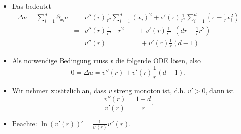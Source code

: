 \documentclass{book}
\newenvironment{itemizedot}{\begin{itemize} \renewcommand{\labelitemi}{$\bullet$}\renewcommand{\labelitemii}{$\bullet$}\renewcommand{\labelitemiii}{$\bullet$}\renewcommand{\labelitemiv}{$\bullet$}}{\end{itemize}}
\begin{document}
\begin{remark*}
\begin{itemizedot}
    
    \[ \nabla_x r = \left( (\langle x, x \rangle)^{\frac{1}{2}} \right)' =
       \frac{1}{2} (\langle x, x \rangle)^{- \frac{1}{2}}  (\langle x, x
       \rangle)' = \frac{1}{2} (\langle x, x \rangle)^{- \frac{1}{2}} 2 x =
       \frac{x}{r} \]
    wobei man $(\langle x, x \rangle)' = 2 x$ aus
    \[ \langle x + h, x + h \rangle = \langle x, x \rangle + 2 \langle x, h
       \rangle + \langle h, h \rangle \]
    f{\"u}r $h \rightarrow 0$ sieht, also insbesondere
    \[ \partial_{x_i} r (x) = \frac{x_i}{r (x)}, \]
    und damit
    \[ \partial_{x_i} u = v' (r) \partial_{x_i} r = v' (r) \frac{x_i}{r} \]
    sowie
    \[ \partial^2_{x_i} u = v'' (r) \left( \frac{x_i}{r} \right)^2 + v' (r)
       \left( \frac{x_i}{r} \right)' = v'' (r) \left( \frac{x_i}{r} \right)^2
       + v' (r) \frac{r - x_i  \frac{x_i}{r}}{r^2} . \]
    \item Das bedeutet
    \begin{eqnarray*}
      \Delta u = \sum_{i = 1}^d \partial_{x_i} u & = & v'' (r) \frac{1}{r^2}
      \sum_{i = 1}^d (x_i)^2 + v' (r) \frac{1}{r^2} \sum_{i = 1}^d \left( r -
      \frac{1}{r} x_i^2 \right)\\
      & = & v'' (r) \frac{1}{r^2} \quad r^2 \qquad + v' (r) \frac{1}{r^2}
      \enspace \left( d r - \frac{1}{r} r^2 \right)\\
      & = & v'' (r) \hspace{5em} + v' (r) \frac{1}{r } (d - 1)
    \end{eqnarray*}
    \item Als notwendige Bedingung muss $v$ die folgende ODE l{\"o}sen, also
    \[ 0 = \Delta u = v'' (r) + v' (r) \frac{1}{r } (d - 1) . \]
    \item Wir nehmen zus{\"a}tzlich an, dass $v$ streng monoton ist, d.h. $v'
    > 0$, dann ist
    \[ \frac{v'' (r)}{v' (r)} = \frac{1 - d}{r} . \]
    \item Beachte: $\ln (v' (r))' = \frac{1}{v' (r)} v'' (r)$.
    

\end{itemizedot}
\end{remark*}
\end{document}
